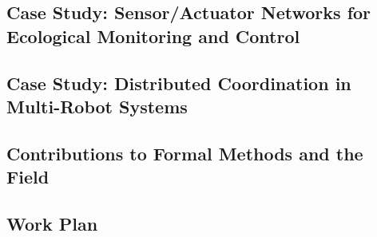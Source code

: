\subsection{Case Study: Sensor/Actuator Networks for Ecological Monitoring and Control}
\label{sec:case-study}


\subsection{Case Study: Distributed Coordination in Multi-Robot Systems}
\label{sec:case-study-robots}


\subsection{Contributions to Formal Methods and the Field}
\label{sec:contributions}


\subsection{Work Plan}

